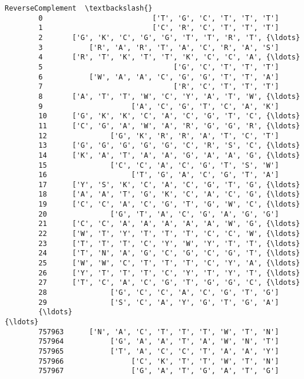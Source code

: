 \documentclass[11pt]{article}
\begin{document}
\begin{Verbatim}[commandchars=\\\{\}]
                                                ReverseComplement  \textbackslash{}
        0                          ['T', 'G', 'C', 'T', 'T', 'T']   
        1                          ['C', 'R', 'C', 'T', 'T', 'T']   
        2       ['G', 'K', 'C', 'G', 'G', 'T', 'T', 'R', 'T', {\ldots}   
        3           ['R', 'A', 'R', 'T', 'A', 'C', 'R', 'A', 'S']   
        4       ['R', 'T', 'K', 'T', 'T', 'K', 'C', 'C', 'A', {\ldots}   
        5                               ['G', 'C', 'T', 'T', 'T']   
        6           ['W', 'A', 'A', 'C', 'G', 'G', 'T', 'T', 'A']   
        7                               ['R', 'C', 'T', 'T', 'T']   
        8       ['A', 'T', 'T', 'W', 'C', 'Y', 'A', 'T', 'W', {\ldots}   
        9                     ['A', 'C', 'G', 'T', 'C', 'A', 'K']   
        10      ['G', 'K', 'K', 'C', 'A', 'C', 'G', 'T', 'C', {\ldots}   
        11      ['C', 'G', 'A', 'W', 'A', 'R', 'G', 'G', 'R', {\ldots}   
        12               ['G', 'K', 'R', 'R', 'A', 'T', 'C', 'T']   
        13      ['G', 'G', 'G', 'G', 'G', 'C', 'R', 'S', 'C', {\ldots}   
        14      ['K', 'A', 'T', 'A', 'A', 'G', 'A', 'A', 'G', {\ldots}   
        15               ['C', 'C', 'A', 'C', 'G', 'T', 'S', 'W']   
        16                    ['T', 'G', 'A', 'C', 'G', 'T', 'A']   
        17      ['Y', 'S', 'K', 'C', 'A', 'C', 'G', 'T', 'G', {\ldots}   
        18      ['A', 'A', 'T', 'G', 'K', 'C', 'A', 'C', 'G', {\ldots}   
        19      ['C', 'C', 'A', 'C', 'G', 'T', 'G', 'W', 'C', {\ldots}   
        20               ['G', 'T', 'A', 'C', 'G', 'A', 'G', 'G']   
        21      ['C', 'C', 'A', 'A', 'A', 'A', 'A', 'W', 'G', {\ldots}   
        22      ['W', 'T', 'Y', 'T', 'T', 'T', 'C', 'C', 'W', {\ldots}   
        23      ['T', 'T', 'T', 'C', 'Y', 'W', 'Y', 'T', 'T', {\ldots}   
        24      ['T', 'N', 'A', 'G', 'C', 'G', 'C', 'G', 'T', {\ldots}   
        25      ['W', 'W', 'C', 'T', 'T', 'T', 'C', 'Y', 'A', {\ldots}   
        26      ['Y', 'T', 'T', 'T', 'C', 'Y', 'T', 'Y', 'T', {\ldots}   
        27      ['T', 'C', 'A', 'C', 'G', 'T', 'G', 'G', 'C', {\ldots}   
        28               ['G', 'C', 'C', 'A', 'C', 'G', 'T', 'G']   
        29               ['S', 'C', 'A', 'Y', 'G', 'T', 'G', 'A']   
        {\ldots}                                                   {\ldots}   
        757963      ['N', 'A', 'C', 'T', 'T', 'T', 'W', 'T', 'N']   
        757964           ['G', 'A', 'A', 'T', 'A', 'W', 'N', 'T']   
        757965           ['T', 'A', 'C', 'C', 'T', 'A', 'A', 'Y']   
        757966                ['C', 'K', 'T', 'T', 'W', 'T', 'N']   
        757967                ['G', 'A', 'T', 'G', 'A', 'T', 'G']   

\end{Verbatim}
\end{document}
